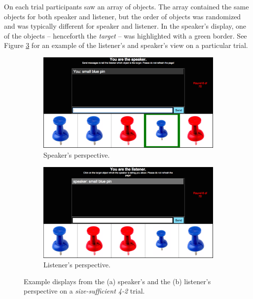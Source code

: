 \documentclass[11pt]{article}
\newcommand{\figref}[1]{Figure \ref{#1}}
\begin{document}
On each trial participants saw an array of objects. The array contained the same objects for both speaker and listener, but the order of objects was randomized and was typically different for speaker and listener. In the speaker's display, one of the objects -- henceforth the \emph{target} -- was highlighted with a green border. See \figref{fig:speakerlistenerperspective} for an example of the listener's and speaker's view on a particular trial.

\begin{figure}
\begin{subfigure}{.5\textwidth}
\includegraphics[width=\textwidth]{pics/speaker-perspective-small.png}
\caption{Speaker's perspective.}
\label{fig:speakerpersp}
\end{subfigure}
\begin{subfigure}{.5\textwidth}
\includegraphics[width=\textwidth]{pics/listener-perspective-small.png}
\caption{Listener's perspective.}
\label{fig:listenerpersp}
\end{subfigure}
\caption{Example displays from the  (a) speaker's and the (b) listener's perspective on a \emph{size-sufficient 4-2} trial.}
\label{fig:speakerlistenerperspective}
\end{figure}
\end{document}
